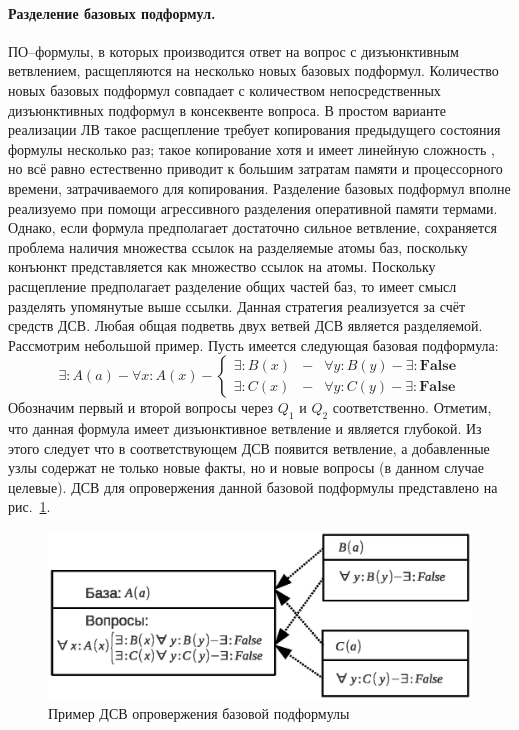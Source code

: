 \paragraph{Разделение базовых подформул.} ПО--формулы, в которых производится ответ на вопрос с дизъюнктивным ветвлением, расщепляются на несколько новых базовых подформул. Количество новых базовых подформул совпадает с количеством непосредственных дизъюнктивных подформул в консеквенте вопроса. В простом варианте реализации ЛВ \cite{dissChe} такое расщепление требует копирования предыдущего состояния формулы несколько раз; такое копирование хотя и имеет линейную сложность \cite{Che2}, но всё равно естественно приводит к большим затратам памяти и процессорного времени, затрачиваемого для копирования. Разделение базовых подформул вполне реализуемо при помощи агрессивного разделения оперативной памяти термами. Однако, если формула предполагает достаточно сильное ветвление, сохраняется проблема наличия множества ссылок на разделяемые атомы баз, поскольку конъюнкт представляется как множество ссылок на атомы. Поскольку расщепление предполагает разделение общих частей баз, то имеет смысл разделять упомянутые выше ссылки. Данная стратегия реализуется за счёт средств ДСВ. Любая общая подветвь двух ветвей ДСВ является разделяемой. Рассмотрим небольшой пример. Пусть имеется следующая базовая подформула:
$$\exists: A(a) - \forall x: A(x) - \left\{
\begin{array}{lcl}
 \exists \colon B(x) & - & \forall y: B(y) - \exists\colon\boldsymbol{False}\\
 \exists \colon C(x) & - & \forall y: C(y) - \exists\colon\boldsymbol{False}
\end{array}
\right. $$
Обозначим первый и второй вопросы через $Q_1$ и $Q_2$ соответственно. Отметим, что данная формула имеет дизъюнктивное ветвление и является глубокой. Из этого следует что в соответствующем ДСВ появится ветвление, а добавленные узлы содержат не только новые факты, но и новые вопросы (в данном случае целевые). ДСВ для опровержения данной базовой подформулы представлено на рис.~\ref{fig:datasharing2}.
\begin{figure}[h]
	\centering
	\includegraphics[width=0.7\linewidth]{pics/DataSharing2.eps}
	\caption{Пример ДСВ опровержения базовой подформулы}
	\label{fig:datasharing2}
\end{figure}

